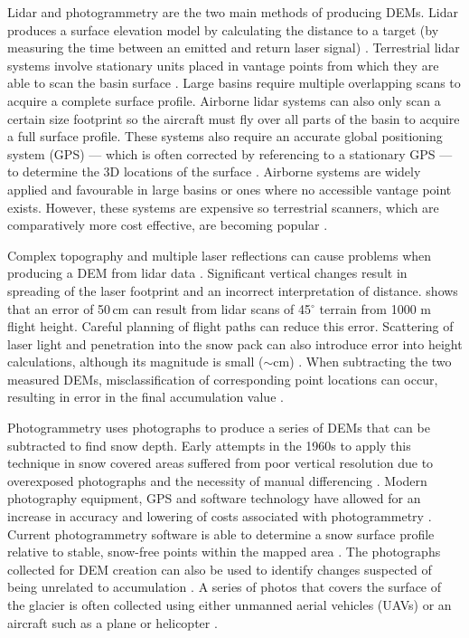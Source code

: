 \documentclass{sfuthesis}
\begin{document}
{\begin{appendices}
Lidar and photogrammetry are the two main methods of producing DEMs. Lidar produces a surface elevation model by calculating the distance to a target (by measuring the time between an emitted and return laser signal) \citep{Deems2006, Sold2013}. Terrestrial lidar systems involve stationary units placed in vantage points from which they are able to scan the basin surface \citep{Grunewald2010}. Large basins require multiple overlapping scans to acquire a complete surface profile. Airborne lidar systems can also only scan a certain size footprint so the aircraft must fly over all parts of the basin to acquire a full surface profile. These systems also require an accurate global positioning system (GPS) --- which is often corrected by referencing to a stationary GPS --- to determine the 3D locations of the surface \citep{Deems2006}. Airborne systems are widely applied and favourable in large basins or ones where no accessible vantage point exists. However, these systems are expensive so terrestrial scanners, which are comparatively more cost effective, are becoming popular \citep{Grunewald2010}. 

Complex topography and multiple laser reflections can cause problems when producing a DEM from lidar data \citep{Deems2006}. Significant vertical changes result in spreading of the laser footprint and an incorrect interpretation of distance. \cite{Deems2006} shows that an error of 50\,cm can result from lidar scans of 45$^\circ$ terrain from 1000 m flight height. Careful planning of flight paths can reduce this error. Scattering of laser light and penetration into the snow pack can also introduce error into height calculations, although its magnitude is small ($\sim$cm) \citep{Deems2006}. When subtracting the two measured DEMs, misclassification of corresponding point locations can occur, resulting in error in the final accumulation value \citep{Deems2006}.  

Photogrammetry uses photographs to produce a series of DEMs that can be subtracted to find snow depth. Early attempts in the 1960s to apply this technique in snow covered areas suffered from poor vertical resolution due to overexposed photographs and the necessity of manual differencing \citep{Nolan2015}. Modern photography equipment, GPS and software technology have allowed for an increase in accuracy and lowering of costs associated with photogrammetry \citep{Nolan2015}. Current photogrammetry software is able to determine a snow surface profile relative to stable, snow-free points within the mapped area \citep{Farinotti2010}. The photographs collected for DEM creation can also be used to identify changes suspected of being unrelated to accumulation \citep{Nolan2015}. {\color{red}A series of photos that covers the surface of the glacier is often collected using either unmanned aerial vehicles (UAVs) \citep[e.g.][]{Buhler2015,Jagt2015,Harder2016} or an aircraft such as a plane or helicopter \citep[e.g.][]{Nolan2015}}. 


\end{appendices}}
\end{document}
